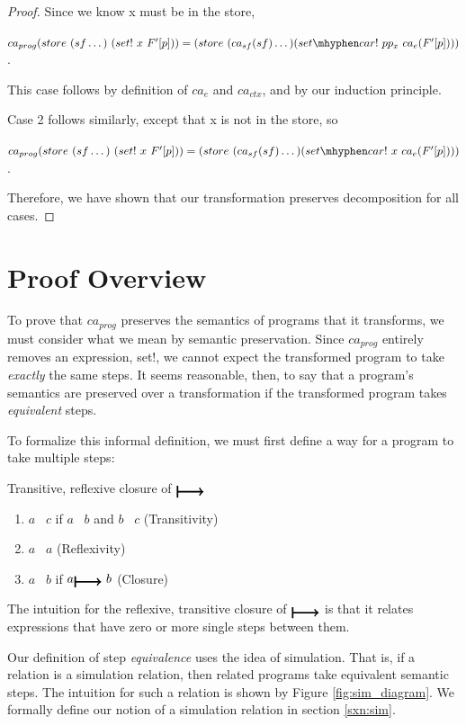 \begin{proof}
Since we know x must be in the store, 

$ca_{prog}(store\ (sf \dots)\ (set!\ x\ F'[p])) = (store\ (ca_{sf}(sf) \dots) (set \mhyphen car!\ pp_x\ ca_{e}(F'[p])))$. 

This case follows by definition of $ca_{e}$ and $ca_{ctx}$, and by our induction principle.

Case 2 follows similarly, except that x is not in the store, so 

$ca_{prog}(store\ (sf \dots)\ (set!\ x\ F'[p])) = (store\ (ca_{sf}(sf) \dots) (set \mhyphen car!\ x\ ca_{e}(F'[p])))$. 

Therefore, we have shown that our transformation preserves decomposition for all cases.
\end{proof}








\newpage
\section{Proof Overview}
To prove that $ca_{prog}$ preserves the semantics of programs that it transforms, we must consider what we mean by semantic preservation. Since $ca_{prog}$ entirely removes an expression, set!, we cannot expect the transformed program to take \textit{exactly} the same steps. It seems reasonable, then, to say that a program's semantics are preserved over a transformation if the transformed program takes \textit{equivalent} steps. 

To formalize this informal definition, we must first define a way for a program to take multiple steps:
\begin{definition}
Transitive, reflexive closure of $\step$
\begin{enumerate}
    \item $a$ \trstep\ $c$ if $a$ \trstep\ $b$ and $b$ \trstep\ $c$ (Transitivity)
    \item $a$ \trstep\ $a$ (Reflexivity)
    \item $a$ \trstep\ $b$ if $a \step\ b$ (Closure)
\end{enumerate}
\end{definition}

The intuition for the reflexive, transitive closure of $\step$ is that it relates expressions that have zero or more single steps between them.

Our definition of step \textit{equivalence} uses the idea of simulation. That is, if a relation is a simulation relation, then related programs take equivalent semantic steps. The intuition for such a relation is shown by Figure \ref{fig:sim_diagram}. We formally define our notion of a simulation relation in section \ref{sxn:sim}.

